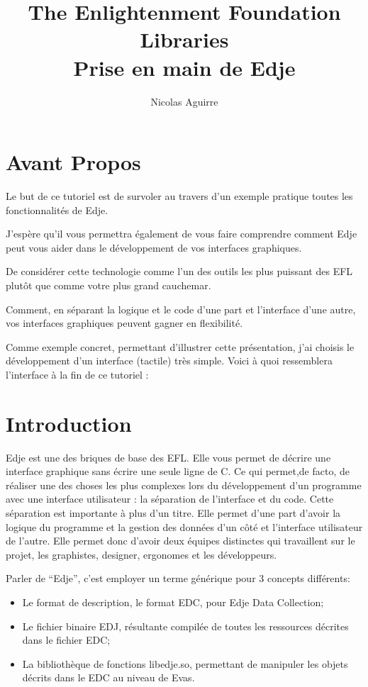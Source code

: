\documentclass[a4paper]{efr}
\title{The Enlightenment Foundation Libraries\\
  \normalsize{Prise en main de Edje}}
\author{Nicolas Aguirre}
\begin{document}
\maketitle
\tableofcontents

\section{Avant Propos}

Le but de ce tutoriel est de survoler au travers d'un exemple pratique toutes
les fonctionnalités de Edje.

J'espère qu'il vous permettra également de vous faire comprendre comment Edje
peut vous aider dans le développement de vos interfaces graphiques.

De considérer cette technologie comme l'un des outils les plus puissant des
EFL plutôt que comme votre plus grand cauchemar.

Comment, en séparant la logique et le code d'une part et l'interface d'une
autre, vos interfaces graphiques peuvent gagner en flexibilité.

Comme exemple concret, permettant d'illustrer cette présentation, j'ai choisis
le développement d'un interface (tactile) très simple.
Voici à quoi ressemblera l'interface à la fin de ce tutoriel :

\section{Introduction}

Edje est une des briques de base des EFL. Elle vous permet de décrire une
interface graphique sans écrire une seule ligne de C. Ce qui permet,de facto,
de réaliser une des choses les plus complexes lors du développement d'un
programme avec une interface utilisateur : la séparation de l'interface et du
code. Cette séparation est importante à plus d'un titre. Elle permet d'une part
d'avoir la logique du programme et la gestion des données d'un côté et
l'interface utilisateur de l'autre. Elle permet donc d'avoir deux équipes
distinctes qui travaillent sur le projet, les graphistes, designer, ergonomes et
les développeurs.

Parler de ``Edje'', c'est employer un terme générique pour 3 concepts
différents:
\begin{itemize}
\item Le format de description, le format EDC, pour Edje Data Collection;
\item Le fichier binaire EDJ, résultante compilée de toutes les ressources
décrites dans le fichier EDC;
\item La bibliothèque de fonctions libedje.so, permettant de manipuler les
objets décrits dans le EDC au niveau de Evas.
\end{itemize}
\end{document}
